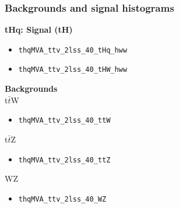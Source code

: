 \documentclass[11pt]{beamer}
\begin{document}
\begin{frame}
\frametitle{Backgrounds and signal histograms}
\textbf{tHq: Signal (tH)}\\
\begin{itemize}
\item \begin{alltt} thqMVA\_ttv\_2lss\_40\_tHq\_hww \end{alltt}
\item \begin{alltt} thqMVA\_ttv\_2lss\_40\_tHW\_hww \end{alltt}
\end{itemize}
\textbf{Backgrounds} \\
t$\bar{t}$W
\begin{itemize}
\item \begin{alltt} thqMVA\_ttv\_2lss\_40\_ttW\end{alltt}
\end{itemize}
t$\bar{t}$Z
\begin{itemize}
\item \begin{alltt}thqMVA\_ttv\_2lss\_40\_ttZ\end{alltt}
\end{itemize}
WZ
\begin{itemize}
\item \begin{alltt}thqMVA\_ttv\_2lss\_40\_WZ	\end{alltt} 
\end{itemize}


\end{frame}
\end{document}

